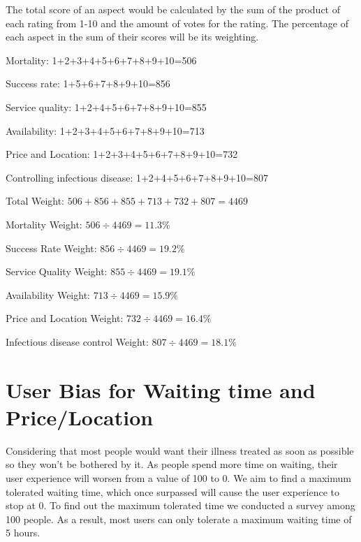 \documentclass{article}
\begin{document}
\begin{appendix}
The total score of an aspect would be calculated by the sum of the product of each rating from 1-10 and the amount of votes for the rating. The percentage of each aspect in the sum of their scores will be its weighting. 

Mortality: 1+2+3+4+5+6+7+8+9+10=506

Success rate: 1+5+6+7+8+9+10=856

Service quality: 1+2+4+5+6+7+8+9+10=855

Availability: 1+2+3+4+5+6+7+8+9+10=713

Price and Location: 1+2+3+4+5+6+7+8+9+10=732

Controlling infectious disease: 1+2+4+5+6+7+8+9+10=807

Total Weight: $506+856+855+713+732+807=4469$

Mortality Weight: $506÷4469=11.3\%$

Success Rate Weight: $856÷4469=19.2\%$

Service Quality Weight: $855÷4469=19.1\%$

Availability Weight: $713÷4469=15.9\%$

Price and Location Weight: $732÷4469=16.4\%$

Infectious disease control Weight: $807÷4469=18.1\%$

\section{User Bias for Waiting time and Price/Location}

Considering that most people would want their illness treated as soon as possible so they won't be bothered by it. As people spend more time on waiting, their user experience will worsen from a value of 100 to 0. We aim to find a maximum tolerated waiting time, which once surpassed will cause the user experience to stop at 0. To find out the maximum tolerated time we conducted a survey among 100 people. As a result, most users can only tolerate a maximum waiting time of 5 hours.


\end{appendix}
\end{document}
